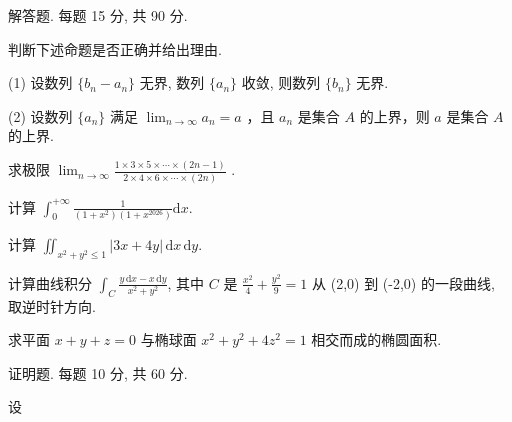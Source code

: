 \par{}
解答题. 每题 15 分, 共 90 分.\par
判断下述命题是否正确并给出理由.\par
(1) 设数列 $\{b_n - a_n\}$ 无界, 数列 $\{a_n\}$ 收敛, 则数列 $\{b_n\}$ 无界.\par
(2) 设数列 $\{a_{n}\}$ 满足 $\lim_{n\to \infty}a_n = a$ ，且 $a_{n}$ 是集合 $A$ 的上界，则 $a$ 是集合 $A$ 的上界.\par
求极限  $\lim_{n\to\infty}\frac{1\times3\times5\times\cdots\times(2n-1)}{2\times4\times6\times\cdots\times(2n)}$ .\par
计算 $\int_0^{+\infty} \frac{1}{(1 + x^2)(1 + x^{2026})} \mathrm{d}x$.\par
计算 $\iint_{x^2 + y^2 \leq 1} |3x + 4y| \, \mathrm{d}x \, \mathrm{d}y$.\par
计算曲线积分 $\int_{C} \frac{y \, \mathrm{d}x - x \, \mathrm{d}y}{x^2 + y^2}$, 其中 $C$ 是 $\frac{x^2}{4} + \frac{y^2}{9} = 1$ 从 (2,0) 到 (-2,0) 的一段曲线, 取逆时针方向.\par
求平面 $x + y + z = 0$ 与椭球面 $x^{2} + y^{2} + 4z^{2} = 1$ 相交而成的椭圆面积.\par
\par{}
证明题. 每题 10 分, 共 60 分.\par
\par{}
设\par
\nopagebreak[4]
